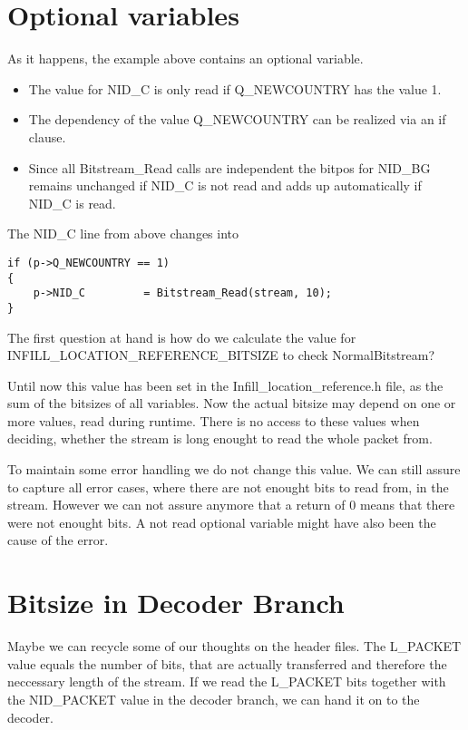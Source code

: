 \documentclass[parskip=half,paper=a4,DIV=13]{scrartcl}
\begin{document}
\section{Optional variables}

As it happens, the example above contains an optional variable.

\begin{itemize}

\item
The value for NID\_C is only read if Q\_NEWCOUNTRY has the value 1.
\item
The dependency of the value Q\_NEWCOUNTRY can be realized via an if clause.
\item
Since all Bitstream\_Read calls are independent the bitpos for NID\_BG remains unchanged
if NID\_C is not read and adds up automatically if NID\_C is read.

\end{itemize}

The NID\_C line from above changes into

\begin{lstlisting}[mathescape]
if (p->Q_NEWCOUNTRY == 1)
{
    p->NID_C         = Bitstream_Read(stream, 10);
}
\end{lstlisting}

The first question at hand is how do we calculate the value for INFILL\_LOCATION\_REFERENCE\_BITSIZE
to check NormalBitstream?

Until now this value has been set in the Infill\_location\_reference.h file, as the sum of the bitsizes
of all variables.
Now the actual bitsize may depend on one or more values, read during runtime.
There is no access to these values when deciding, whether the stream is long enought to read the whole packet from.

To maintain some error handling we do not change this value.
We can still assure to capture all error cases, where there are not enought bits to read from, in the stream.
However we can not assure anymore that a return of 0 means that there were not enought bits.
A not read optional variable might have also been the cause of the error.

\section{Bitsize in Decoder Branch}

Maybe we can recycle some of our thoughts on the header files. The L\_PACKET value equals the number
of bits, that are actually transferred and therefore the neccessary length of the stream.
If we read the L\_PACKET bits together with the NID\_PACKET value in the decoder branch,
we can hand it on to the decoder.
\end{document}
